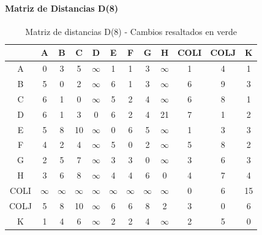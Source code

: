 \documentclass[12pt]{article}
\begin{document}
\paragraph{Matriz de Distancias D(8)}
\begin{table}[h!]
\centering
\begin{tabular}{|c|c|c|c|c|c|c|c|c|c|c|c|}
\hline
 & A & B & C & D & E & F & G & H & COLI & COLJ & K \\\hline
A & 0 & 3 & 5 & $\infty$ & 1 & 1 & 3 & $\infty$ & 1 & 4 & 1 \\\hline
B & 5 & 0 & 2 & $\infty$ & 6 & 1 & 3 & $\infty$ & 6 & 9 & 3 \\\hline
C & 6 & 1 & 0 & $\infty$ & 5 & 2 & 4 & $\infty$ & 6 & 8 & 1 \\\hline
D & 6 & 1 & 3 & 0 & 6 & 2 & 4 & 21 & 7 & 1 & 2 \\\hline
E & 5 & 8 & 10 & $\infty$ & 0 & 6 & 5 & $\infty$ & 1 & 3 & 3 \\\hline
F & 4 & 2 & 4 & $\infty$ & 5 & 0 & 2 & $\infty$ & 5 & 8 & 2 \\\hline
G & 2 & 5 & 7 & $\infty$ & 3 & 3 & 0 & $\infty$ & 3 & 6 & 3 \\\hline
H & 3 & 6 & 8 & $\infty$ & 4 & 4 & 6 & 0 & 4 & 7 & 4 \\\hline
COLI & $\infty$ & $\infty$ & $\infty$ & $\infty$ & $\infty$ & $\infty$ & $\infty$ & $\infty$ & 0 & 6 & 15 \\\hline
COLJ & \cellcolor{lightgreen} 5 & \cellcolor{lightgreen} 8 & \cellcolor{lightgreen} 10 & $\infty$ & \cellcolor{lightgreen} 6 & \cellcolor{lightgreen} 6 & \cellcolor{lightgreen} 8 & 2 & 3 & 0 & \cellcolor{lightgreen} 6 \\\hline
K & 1 & 4 & 6 & $\infty$ & 2 & 2 & 4 & $\infty$ & 2 & 5 & 0 \\\hline
\end{tabular}
\caption{Matriz de distancias D(8) - Cambios resaltados en verde}
\end{table}
\end{document}
